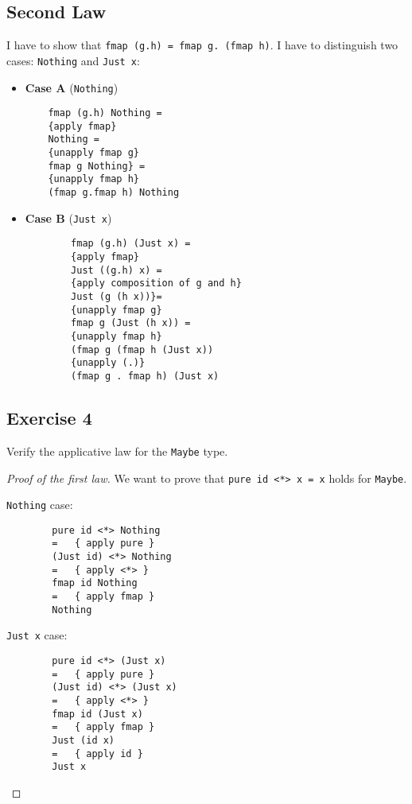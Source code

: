 \documentclass[a4paper]{scrartcl}
\newcommand{\haskellCode}[1]{\lstinline|#1|}
\begin{document}
\subsection*{Second Law}
I have to show that \haskellCode{fmap (g.h) = fmap g. (fmap h)}. I have to distinguish 
two cases: \haskellCode{Nothing} and \haskellCode{Just x}:
\begin{itemize}
	\item \textbf{Case A} (\haskellCode{Nothing})
	
	\begin{verbatim}
	fmap (g.h) Nothing = 
	{apply fmap}
	Nothing =
	{unapply fmap g}
	fmap g Nothing} =
	{unapply fmap h}
	(fmap g.fmap h) Nothing
	\end{verbatim} 
	
	\item \textbf{Case B} (\haskellCode{Just x})
		\begin{verbatim}
		fmap (g.h) (Just x) =  
		{apply fmap}
		Just ((g.h) x) = 
		{apply composition of g and h}
		Just (g (h x))}=
		{unapply fmap g}
		fmap g (Just (h x)) = 
		{unapply fmap h} 
		(fmap g (fmap h (Just x))
		{unapply (.)}
		(fmap g . fmap h) (Just x)
		\end{verbatim}

\end{itemize}

\subsection*{Exercise 4}
	Verify the applicative law for the \verb|Maybe| type.


\begin{proof}[Proof of the first law]
	We want to prove that \verb|pure id <*> x = x| holds for \verb|Maybe|.
	
	\verb|Nothing| case:
	
	\begin{verbatim}
		pure id <*> Nothing
		=   { apply pure }
		(Just id) <*> Nothing
		=   { apply <*> }
		fmap id Nothing
		=   { apply fmap }
		Nothing
	\end{verbatim}
	
	\verb|Just x| case:
	
	\begin{verbatim}
		pure id <*> (Just x)
		=   { apply pure }
		(Just id) <*> (Just x)
		=   { apply <*> }
		fmap id (Just x)
		=   { apply fmap }
		Just (id x)
		=   { apply id }
		Just x
	\end{verbatim}
\end{proof}
\end{document}
